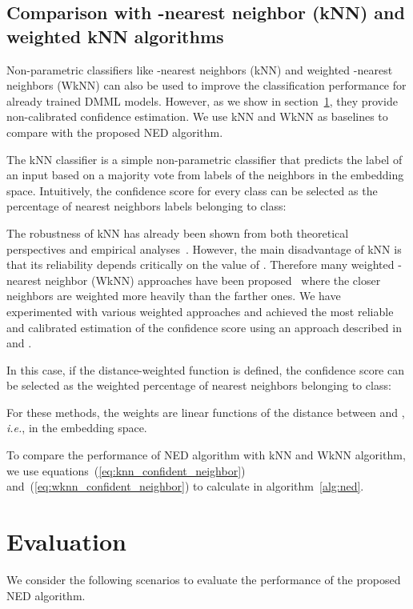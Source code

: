 \documentclass{article}
\newcommand{\ie}{{\it i.e.}}
\begin{document}
\subsection{Comparison with -nearest neighbor (kNN) and weighted kNN algorithms}

Non-parametric classifiers like -nearest neighbors (kNN) and weighted -nearest neighbors (WkNN) can also be used to improve the classification performance for already trained DMML models. However, as we show in section~\ref{sec:evaluation}, they provide non-calibrated confidence estimation. We use kNN and WkNN as baselines to compare with the proposed NED algorithm.

The kNN classifier is a simple non-parametric classifier that predicts the label of an input based on a majority vote from labels of the  neighbors in the embedding space. Intuitively, the confidence score for every class can be selected as the percentage of nearest neighbors labels belonging to  class:


The robustness of kNN has already been shown from both theoretical perspectives and empirical analyses~\cite{b44, b46, b41, b47}. However,
the main disadvantage of kNN is that its reliability depends critically on the value of .
Therefore many weighted -nearest neighbor (WkNN) approaches have been proposed~\cite{b69, b70, b71} where the closer neighbors are weighted more heavily than the farther ones. We have experimented with various weighted approaches
and achieved the most reliable and calibrated estimation of the confidence score using an approach described in \cite{b70} and \cite{b69}.

In this case, if the distance-weighted function  is defined,  the confidence score can be selected as the weighted percentage of nearest neighbors belonging to  class:

For these methods, the weights  are linear functions of the distance between  and , \ie, in the embedding space.

To compare the performance of NED algorithm with kNN and WkNN algorithm, we use equations~(\ref{eq:knn_confident_neighbor}) and~(\ref{eq:wknn_confident_neighbor}) to calculate  in algorithm~\ref{alg:ned}.

\section{Evaluation}
\label{sec:evaluation}

We consider the following scenarios to evaluate the performance of the proposed NED algorithm.
\end{document}
